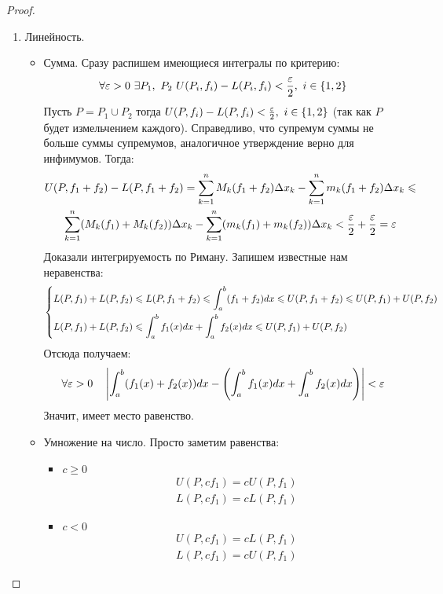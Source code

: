 \begin{proof}~
	\begin{enumerate}
		\item Линейность.
		\begin{itemize}
			\item Сумма. Сразу распишем имеющиеся интегралы по критерию:
			\[
				\forall \varepsilon > 0\ \exists P_1,\ P_2\ U(P_i, f_i) - L(P_i, f_i) < \frac{\varepsilon}{2},\ i \in \{1, 2\}
			\]
			Пусть $P = P_1 \cup P_2$ тогда $U(P, f_i) - L(P, f_i) < \frac{\varepsilon}{2},\ i \in \{1, 2\}$ (так как $P$ будет измельчением каждого).
			Справедливо, что супремум суммы не больше суммы супремумов, аналогичное утверждение верно для инфимумов. Тогда:
			\begin{multline*}
				U(P, f_1 + f_2) - L(P, f_1 + f_2) = \sum\limits_{k = 1}^nM_k(f_1 + f_2)\Delta x_k - \sum\limits_{k = 1}^nm_k(f_1 + f_2)\Delta x_k \leqslant
				\\
				\sum\limits_{k = 1}^n(M_k(f_1) + M_k(f_2))\Delta x_k - \sum\limits_{k = 1}^n(m_k(f_1) + m_k(f_2))\Delta x_k < \frac{\varepsilon}{2} + \frac{\varepsilon}{2} = \varepsilon
			\end{multline*}
			Доказали интегрируемость по Риману. Запишем известные нам неравенства:
			\[
			\left\{\begin{aligned}
				&{L(P, f_1) + L(P, f_2) \leqslant L(P, f_1 + f_2) \leqslant \int_{a}^{b}(f_1 + f_2)dx \leqslant U(P, f_1 + f_2) \leqslant U(P, f_1) + U(P, f_2)}
				\\
				&{L(P, f_1) + L(P, f_2) \leqslant \int_a^b f_1(x)dx + \int_a^b f_2(x)dx \leqslant U(P, f_1) + U(P, f_2)}
			\end{aligned}\right.
			\]
			Отсюда получаем:
			\[
				\forall \varepsilon > 0 \quad \left|\int_a^b(f_1(x) + f_2(x))dx - \left(\int_a^bf_1(x)dx + \int_a^bf_2(x)dx\right)\right| < \varepsilon
			\]
			Значит, имеет место равенство.
			
			\item Умножение на число. Просто заметим равенства:
			\begin{itemize}
				\item $c \geq 0$
				\begin{align*}
				& U(P, cf_1) = cU(P, f_1)
				\\
				& L(P, cf_1) = cL(P, f_1)
				\end{align*}
				\item $c < 0$
				\begin{align*}
				& U(P, cf_1) = cL(P, f_1)
				\\
				& L(P, cf_1) = cU(P, f_1)
				\end{align*}
			\end{itemize}
		\end{itemize}
		

\end{enumerate}
\end{proof}
